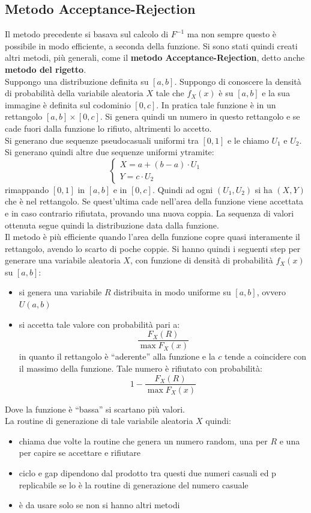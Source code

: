 \documentclass[a4paper,12pt, oneside]{book}
\begin{document}
\subsection{Metodo Acceptance-Rejection}
Il metodo precedente si basava sul calcolo di $F^{-1}$ ma non sempre questo è
possibile in modo efficiente, a seconda della funzione. Si sono stati quindi
creati altri metodi, più generali, come il 
\textbf{metodo Acceptance-Rejection}, detto anche \textbf{metodo del rigetto}.\\
Suppongo una distribuzione definita su $[a,b]$. Suppongo di conoscere la densità
di probabilità della variabile aleatoria $X$ tale che $f_X(x)$ è su $[a,b]$ e la
sua immagine è definita sul codominio $[0,c]$. In pratica tale funzione è in un
rettangolo $[a,b]\times[0,c]$. Si genera quindi un numero in questo rettangolo e
se cade fuori dalla funzione lo rifiuto, altrimenti lo accetto.\\
Si generano due sequenze pseudocasuali uniformi tra $[0,1]$ e le chiamo $U_1$ e
$U_2$. Si generano quindi altre due sequenze uniformi ytramite:
\[
  \begin{cases}
    X=a+(b-a)\cdot U_1\\
    Y=c\cdot U_2
  \end{cases}
\]
rimappando $[0,1]$ in $[a,b]$ e in $[0,c]$. Quindi ad ogni $(U_1,U_2)$ si ha
$(X,Y)$ che è nel rettangolo. Se quest'ultima cade nell'area della funzione
viene accettata e in caso contrario rifiutata, provando una nuova coppia. La
sequenza di valori ottenuta segue quindi la distribuzione data dalla funzione.\\
Il metodo è più efficiente quando l'area della funzione copre quasi interamente
il rettangolo, avendo lo scarto di poche coppie. Si hanno quindi i seguenti
step per generare una variabile aleatoria $X$, con funzione di densità di
probabilità $f_X(x)$ su $[a,b]$:
\begin{itemize}
  \item si genera una variabile $R$ distribuita in modo uniforme su $[a,b]$,
  ovvero $U(a,b)$
  \item si accetta tale valore con probabilità pari a:
  \[\frac{F_X(R)}{\max F_X(x)}\]
  in quanto il rettangolo è ``aderente'' alla funzione e la $c$ tende a
  coincidere con il massimo della funzione. Tale numero è rifiutato con
  probabilità:
  \[1-\frac{F_X(R)}{\max F_X(x)}\]
\end{itemize}
Dove la funzione è ``bassa'' si scartano più valori.\\
La routine di generazione di tale variabile aleatoria $X$ quindi:
\begin{itemize}
  \item chiama due volte la routine che genera un numero random, una per $R$ e
  una per capire se accettare e rifiutare
  \item ciclo e gap dipendono dal prodotto tra questi due numeri casuali ed p
  replicabile se lo è la routine di generazione del numero casuale
  \item è da usare solo se non si hanno altri metodi
\end{itemize}
\end{document}
